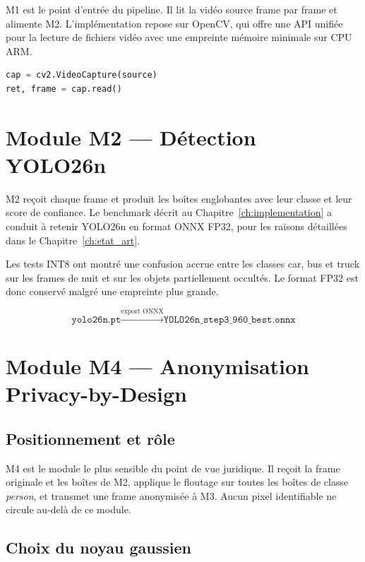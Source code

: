 M1 est le point d'entrée du pipeline.
Il lit la vidéo source frame par frame
et alimente M2. L'implémentation repose
sur OpenCV, qui offre une API unifiée
pour la lecture de fichiers vidéo avec
une empreinte mémoire minimale sur
CPU ARM.

\begin{lstlisting}[language=Python,
  caption={Module M1 — lecture vidéo}]
cap = cv2.VideoCapture(source)
ret, frame = cap.read()
\end{lstlisting}

\section{Module M2 — Détection YOLO26n}

M2 reçoit chaque frame et produit les
boîtes englobantes avec leur classe
et leur score de confiance. Le benchmark
décrit au Chapitre~\ref{ch:implementation}
a conduit à retenir YOLO26n en format
ONNX FP32, pour les raisons détaillées
dans le Chapitre~\ref{ch:etat_art}.

Les tests INT8 ont montré une confusion
accrue entre les classes car, bus et
truck sur les frames de nuit et sur
les objets partiellement occultés.
Le format FP32 est donc conservé malgré
une empreinte plus grande.

\begin{equation}
\texttt{yolo26n.pt}
\xrightarrow{\text{export ONNX}}
\texttt{YOLO26n\_step3\_960\_best.onnx}
\label{eq:export}
\end{equation}

\section{Module M4 — Anonymisation
         Privacy-by-Design}
\label{sec:m4}

\subsection{Positionnement et rôle}

M4 est le module le plus sensible du
point de vue juridique. Il reçoit la
frame originale et les boîtes de M2,
applique le floutage sur toutes les
boîtes de classe \textit{person}, et
transmet une frame anonymisée à M3.
Aucun pixel identifiable ne circule
au-delà de ce module.

\subsection{Choix du noyau gaussien}

